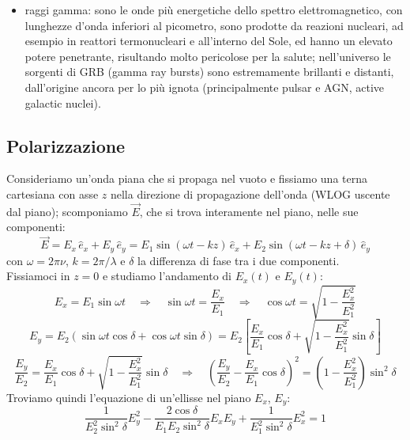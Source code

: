 \documentclass[]{article}
\begin{document}
\begin{itemize}
	\item raggi gamma: sono le onde più energetiche dello spettro elettromagnetico, con lunghezze d'onda inferiori al picometro, sono prodotte da reazioni nucleari, ad esempio in reattori termonucleari e all'interno del Sole, ed hanno un elevato potere penetrante, risultando molto pericolose per la salute; nell'universo le sorgenti di GRB (gamma ray bursts) sono estremamente brillanti e distanti, dall'origine ancora per lo più ignota (principalmente pulsar e AGN, active galactic nuclei).
\end{itemize}

\subsection{Polarizzazione}

Consideriamo un'onda piana che si propaga nel vuoto e fissiamo una terna cartesiana con asse $ z $ nella direzione di propagazione dell'onda (WLOG uscente dal piano); scomponiamo $ \vec{E} $, che si trova interamente nel piano, nelle sue componenti:
\begin{equation}
	\vec{E} = E_x \,\hat{e}_x + E_y \,\hat{e}_y = E_1 \sin(\omega t - kz) \,\hat{e}_x + E_2 \sin(\omega t - kz + \delta) \,\hat{e}_y
	\label{eq:24}
\end{equation}
con $ \omega = 2\pi \nu $, $ k = 2\pi / \lambda $ e $ \delta $ la differenza di fase tra i due componenti. \\ 
%
Fissiamoci in $ z = 0 $ e studiamo l'andamento di $ E_x(t) $ e $ E_y(t) $:
\begin{equation}
	E_x = E_1 \sin \omega t \quad\Longrightarrow\quad \sin \omega t = \frac{E_x}{E_1} \quad\Longrightarrow\quad \cos \omega t = \sqrt{1 - \frac{E_x^2}{E_1^2}}
	\label{eq:25}
\end{equation}
\begin{equation}
	E_y = E_2 \left(\sin \omega t \cos \delta + \cos \omega t \sin \delta\right) = E_2 \left[ \frac{E_x}{E_1} \cos \delta + \sqrt{1 - \frac{E_x^2}{E_1^2}} \sin \delta\right]
	\label{eq:26}
\end{equation}
\begin{equation}
	\frac{E_y}{E_2} = \frac{E_x}{E_1} \cos \delta + \sqrt{1 - \frac{E_x^2}{E_1^2}} \sin \delta \quad\Longrightarrow\quad \left(\frac{E_y}{E_2} - \frac{E_x}{E_1} \cos \delta\right)^2 = \left(1 - \frac{E_x^2}{E_1^2}\right) \sin^2 \delta
	\label{eq:27}
\end{equation}
Troviamo quindi l'equazione di un'ellisse nel piano $ E_x $, $ E_y $:
\begin{equation}
	\frac{1}{E_2^2 \sin^2 \delta} E_y^2 - \frac{2\cos \delta}{E_1 E_2 \sin^2 \delta} E_x E_y + \frac{1}{E_1^2 \sin^2 \delta} E_x^2 = 1
	\label{eq:28}
\end{equation}
\end{document}
